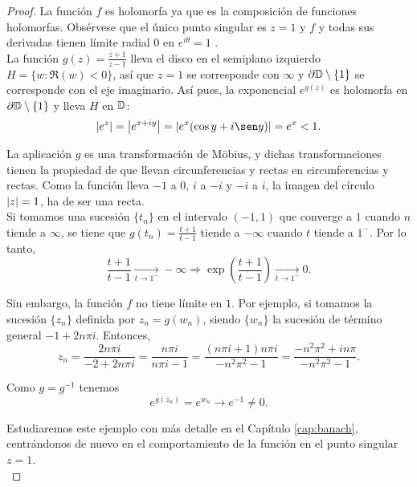 \begin{proof}
    La función $f$ es holomorfa ya que es la composición de funciones holomorfas. Obsérvese que el único punto singular es $z = 1$ y $f$ y todas sus derivadas tienen límite radial 0 en $e^{i \theta} = 1$ . \\

    La función $g(z) = \frac{z + 1}{z - 1}$ lleva el disco en el semiplano izquierdo $H = \{w: \Re (w) < 0\}$, así que $z = 1$ se corresponde con $\infty$ y $\partial \mathbb{D} \setminus \{1\}$ se corresponde con el eje imaginario. Así pues, la exponencial $e^{g(z)}$ es holomorfa en $\partial \mathbb{D} \setminus \{1\}$ y lleva $H$ en $\mathbb{D}$:
    \begin{equation*}
        \abs{e^z} = \abs{e^{x+iy}} = \abs{e^{x}(\cos y + i\sen y)} = e^{x} < 1.
    \end{equation*}

    La aplicación $g$ es una transformación de Möbius, y dichas transformaciones tienen la propiedad de que llevan circunferencias y rectas en circunferencias y rectas. Como la función lleva $-1$ a $0$, $i$ a $-i$ y $-i$ a $i$, la imagen del círculo $\left\lvert z\right\rvert=1$, ha de ser una recta. \\

    Si tomamos una sucesión $\{t_n\}$ en el intervalo $(-1,1)$ que converge a $1$ cuando $n$ tiende a $\infty$, se tiene que $g(t_n)  = \frac{t + 1}{t - 1}$ tiende a $- \infty$ cuando $t$ tiende a $1^-$. Por lo tanto,
    \begin{equation*}
        \frac{t + 1}{t - 1} \xrightarrow[t \to 1^-]{}  - \infty \Rightarrow \exp \left(  \frac{t + 1}{t - 1} \right) \xrightarrow[t \to 1^-]{} 0.
    \end{equation*}

    Sin embargo, la función $f$ no tiene límite en $1$. Por ejemplo, si tomamos la sucesión $\{z_n\}$ definida por $z_n = g(w_n)$, siendo $\{w_n\}$ la sucesión de término general $-1 + 2n \pi i$. Entonces,
     \begin{equation*}
         z_n = \frac{2n \pi i}{-2 + 2n \pi i} = \frac{n \pi i}{n \pi i - 1} =  \frac{(n \pi i + 1) n \pi i}{- n^2 \pi^2 - 1} = \frac{-n^2 \pi^2 + i n \pi}{-n^2 \pi^2 - 1}.
     \end{equation*}

     Como $g = g^{-1}$ tenemos
     \begin{equation*}
         e^{g(z_n)} = e^{w_n} \to e^{-1} \not = 0.
     \end{equation*}

     Estudiaremos este ejemplo con más detalle en el Capítulo \ref{cap:banach}, centrándonos de nuevo en el comportamiento de la función en el punto singular $z = 1$. \\
 \end{proof}
